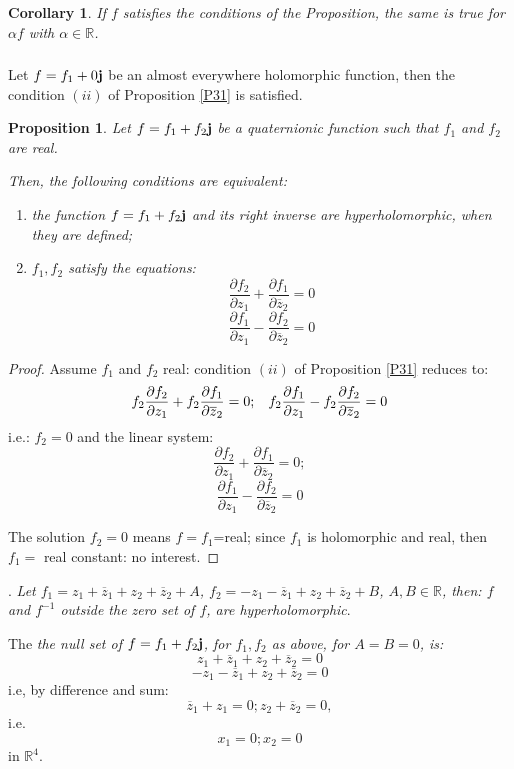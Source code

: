 \documentclass[12pt]{amsart}
\newtheorem{cor}[thm]{Corollary}
\newtheorem{prop}[thm]{Proposition}
\theoremstyle{definition}
\begin{document}
\begin{cor}\label{Cor32} {If $f$ satisfies the conditions of the Proposition, the same is true for $\alpha f$ with $\alpha\in {\mathbb R}$}.\end{cor}

\subsubsection{} Let $f=f_1+0{\bf j}$ be an almost everywhere holomorphic function, then the condition $(ii)$ of Proposition \ref{P31} is satisfied.

\begin{prop}\label{P33} Let $f=f_1+f_2{\bf j}$ be a quaternionic function such that $f_1$ and $f_2$ are real.

Then, the following conditions are equivalent:
\begin{enumerate}
\item[$(i)$] the function $f=f_1+f_2{\bf j}$ and its right inverse are hyperholomorphic, when they are defined; 
\item[$(ii)$] $f_1,f_2$ satisfy the equations:
$$
\frac{\partial f_2}{\partial z_1}+\frac{\partial f_1}{\partial \overline z_2}=0
$$ 
$$
\frac{\partial f_1}{\partial z_1}-\frac{\partial f_2}{\partial\overline z_2}=0
$$
\end{enumerate}
\end{prop}

\begin{proof}Assume $f_1$ and $f_2$ real: condition $(ii)$ of Proposition \ref{P31} reduces to: 
$$
f_2\frac{\partial f_2}{\partial z_1}+f_2\frac{\partial f_1}{\partial \overline z_2}=0;\hskip 3mm f_2\frac{\partial f_1}{\partial z_1}-f_2\frac{\partial f_2}{\partial\overline z_2}=0
$$
i.e.: $f_2=0$ and the linear system: 
$$
\frac{\partial f_2}{\partial z_1}+\frac{\partial f_1}{\partial \overline z_2}=0;
$$ 
$$
\frac{\partial f_1}{\partial z_1}-\frac{\partial f_2}{\partial\overline z_2}=0
$$

The solution $f_2=0$ means $f=f_1$=real; since $f_1$ is holomorphic and real, then $f_1=$ real constant: no interest.\end{proof}
.
{\it Let $f_1=z_1+\overline z_1+z_2+\overline z_2+A$, $f_2= -z_1-\overline z_1+z_2+\overline z_2+ B$, $A, B\in{\mathbb R}$, then: $f$ and $f^{-1}$ outside the zero set of $f$, are hyperholomorphic}.\medskip

The {\it the null set of $f= f_1+f_2{\bf j}$, for $f_1,f_2$ as above, for $A=B=0$, is:
$$
z_1+\overline z_1+z_2+\overline z_2=0
$$
$$
-z_1-\overline z_1+z_2+\overline z_2=0
$$}
i.e, by difference and sum:
$$
\overline z_1+z_1=0; z_2+\overline z_2=0,
$$
i.e. 
$$
x_1=0; x_2=0
$$
in ${\mathbb R}^4$.
\end{document}
